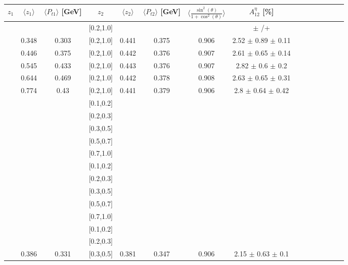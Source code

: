 \begin{table}[H]\tiny
\centering
\renewcommand{\arraystretch}{1.5}
\begin{tabular}{|c| c| c| c| c| c| c| c| c| c|c| c| c| c| c|}
\hline
$z_1$ & $\langle  z_1\rangle$ & $\langle  P_{t1} \rangle$  [GeV] & $z_2$ & $\langle  z_2 \rangle$ & $\langle  P_{t2}  \rangle$ [GeV] & $\langle\frac{\sin^2(\theta)}{1+\cos^2(\theta)}\rangle$ & $A_{12}^{\eta}$ [\%]  \\ \hline
[0.2,0.3]	&		&		&	[0.2,1.0]	&		&		&		&		$\pm$			/+		\\ \hline
[0.3,0.4]	&	0.348	&	0.303	&	[0.2,1.0]	&	0.441	&	0.375	&	0.906	&2.52  $\pm$ 0.89  $\pm$ 0.11   \\ \hline
[0.4,0.5]	&	0.446	&	0.375	&	[0.2,1.0]	&	0.442	&	0.376	&	0.907	&2.61  $\pm$ 0.65  $\pm$ 0.14   \\ \hline
[0.5,0.6]	&	0.545	&	0.433	&	[0.2,1.0]	&	0.443	&	0.376	&	0.907	&2.82  $\pm$ 0.6  $\pm$ 0.2     \\ \hline
[0.6,0.7]	&	0.644	&	0.469	&	[0.2,1.0]	&	0.442	&	0.378	&	0.908	&2.63  $\pm$ 0.65  $\pm$ 0.31   \\ \hline
[0.7,1.0]	&	0.774	&	0.43	&	[0.2,1.0]	&	0.441	&	0.379	&	0.906	&2.8  $\pm$ 0.64  $\pm$ 0.42    \\ \hline
\hline
[0.1,0.2]	&		&		&	[0.1,0.2]	&		&		&		&							\\ \hline
[0.1,0.2]	&		&		&	[0.2,0.3]	&		&		&		&							\\ \hline
[0.1,0.2]	&		&		&	[0.3,0.5]	&		&		&		&							\\ \hline
[0.1,0.2]	&		&		&	[0.5,0.7]	&		&		&		&							\\ \hline
[0.1,0.2]	&		&		&	[0.7,1.0]	&		&		&		&							\\ \hline
\hline
[0.2,0.3]	&		&		&	[0.1,0.2]	&		&		&		&							\\ \hline
[0.2,0.3]	&		&		&	[0.2,0.3]	&		&		&		&							\\ \hline
[0.2,0.3]	&		&		&	[0.3,0.5]	&		&		&		&							\\ \hline
[0.2,0.3]	&		&		&	[0.5,0.7]	&		&		&		&							\\ \hline
[0.2,0.3]	&		&		&	[0.7,1.0]	&		&		&		&							\\ \hline
\hline
[0.3,0.5]	&		&		&	[0.1,0.2]	&		&		&		&							\\ \hline
[0.3,0.5]	&		&		&	[0.2,0.3]	&		&		&		&							\\ \hline
[0.3,0.5]	&	0.386	&	0.331	&	[0.3,0.5]	&	0.381	&	0.347	&	0.906	&	2.15  $\pm$ 0.63  $\pm$ 0.1     \\ \hline

\end{tabular}
\end{table}
